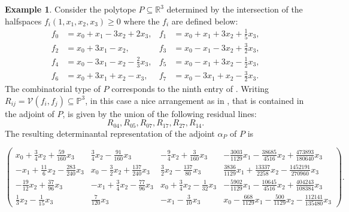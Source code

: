 \documentclass[a4paper,10pt]{amsart}
\theoremstyle{definition}
\newtheorem{ex}[Def]{Example}
\theoremstyle{plain}
\newcommand{\cV}{{\mathcal V}}
\newcommand{\R}{{\mathbb R}}
\newcommand{\pp}{\mathbb{P}}
\begin{document}
\begin{ex}
 Consider the polytope $P \subseteq \R^3$ determined by the intersection of the halfspaces $f_i(1,x_1,x_2,x_3)\geq 0$ where the $f_i$ are defined below:
 \begin{align*}
     f_0 &= x_0 + x_1 - 3x_2 + 2x_3, &
     f_1 &= x_0 + x_1 + 3x_2 + \frac{1}{5}x_3, \\
     f_2 &= x_0 + 3x_1 - x_2, &
     f_3 &= x_0 - x_1 - 3x_2 + \frac{3}{2}x_3, \\
     f_4 &= x_0 - 3x_1 - x_2 - \frac{2}{3}x_3, &
     f_5 &= x_0 - x_1 + 3x_2 - \frac{1}{2}x_3, \\
     f_6 &= x_0 + 3x_1 + x_2 - x_3, &
     f_7 &= x_0 - 3x_1 + x_2 - \frac{3}{2}x_3.
 \end{align*}
 The combinatorial type of $P$ corresponds to the ninth entry of . Writing $R_{ij} = \cV(f_i,f_j)\subseteq\pp^3$, in this case a nice arrangement as in , that is contained in the adjoint of $P$, is given by the union of the following residual lines:
 \begin{equation*}
    R_{04}, R_{05}, R_{07}, R_{17}, R_{27}, R_{14}. 
 \end{equation*}
 The resulting determinantal representation of the adjoint $\alpha_P$ of $P$ is
 \begin{tiny}
 \begin{equation*}
     \begin{pmatrix}
         x_0+\frac{3}{4}x_2+\frac{59}{160}x_3  &  \frac{3}{4}x_2-\frac{91}{160}x_3  &  -\frac{9}{4}x_2+\frac{3}{160}x_3  &  -\frac{3003}{1129}x_1-\frac{38685}{4516}x_2+\frac{473893}{180640}x_3 \\[3pt]
         -x_1+\frac{11}{6}x_2-\frac{283}{240}x_3  &  x_0-\frac{3}{2}x_2+\frac{137}{240}x_3  &  \frac{3}{2}x_2-\frac{137}{80}x_3  &  \frac{3836}{1129}x_1+\frac{13337}{2258}x_2-\frac{1452191}{270960}x_3 \\[3pt]
         -\frac{19}{12}x_2+\frac{37}{96}x_3  &  -x_1+\frac{3}{4}x_2-\frac{77}{96}x_3  &  x_0+\frac{3}{4}x_2-\frac{1}{32}x_3  &  -\frac{5902}{1129}x_1-\frac{10645}{4516}x_2+\frac{404243}{108384}x_3 \\[3pt]
         \frac{1}{3}x_2-\frac{1}{15}x_3  &  \frac{7}{120}x_3  &  -x_1-\frac{3}{10}x_3  &  x_0-\frac{668}{1129}x_1-\frac{500}{1129}x_2-\frac{112141}{135480}x_3
     \end{pmatrix}.
 \end{equation*}
 \end{tiny}
\end{ex}
\end{document}
